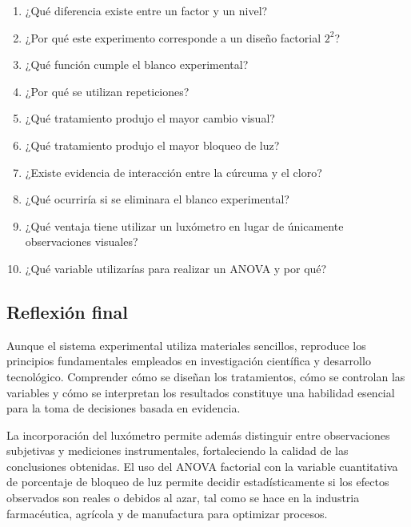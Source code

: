 \begin{enumerate}
\item ¿Qué diferencia existe entre un factor y un nivel?
\item ¿Por qué este experimento corresponde a un diseño factorial $2^2$?
\item ¿Qué función cumple el blanco experimental?
\item ¿Por qué se utilizan repeticiones?
\item ¿Qué tratamiento produjo el mayor cambio visual?
\item ¿Qué tratamiento produjo el mayor bloqueo de luz?
\item ¿Existe evidencia de interacción entre la cúrcuma y el cloro?
\item ¿Qué ocurriría si se eliminara el blanco experimental?
\item ¿Qué ventaja tiene utilizar un luxómetro en lugar de únicamente observaciones visuales?
\item ¿Qué variable utilizarías para realizar un ANOVA y por qué?
\end{enumerate}

\subsection{Reflexión final}

Aunque el sistema experimental utiliza materiales sencillos, reproduce los principios fundamentales empleados en investigación científica y desarrollo tecnológico. Comprender cómo se diseñan los tratamientos, cómo se controlan las variables y cómo se interpretan los resultados constituye una habilidad esencial para la toma de decisiones basada en evidencia.

La incorporación del luxómetro permite además distinguir entre observaciones subjetivas y mediciones instrumentales, fortaleciendo la calidad de las conclusiones obtenidas. El uso del ANOVA factorial con la variable cuantitativa de porcentaje de bloqueo de luz permite decidir estadísticamente si los efectos observados son reales o debidos al azar, tal como se hace en la industria farmacéutica, agrícola y de manufactura para optimizar procesos.
